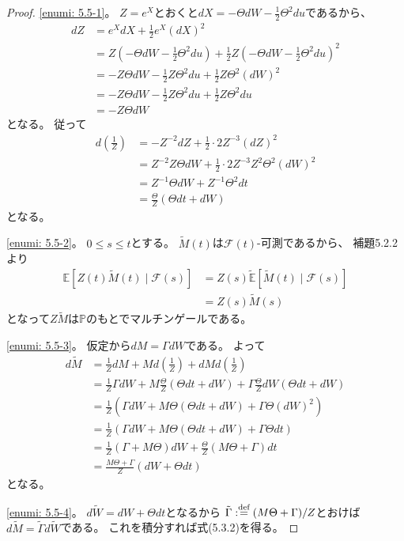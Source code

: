 \documentclass[uplatex]{jsarticle}
\theoremstyle{definition}
\def\P{\mathbb{P}}
\def\E{\mathbb{E}}
\def\mcF{\mathcal{F}}
\def\dfn{:\overset{\mbox{{\scriptsize def}}}{=}}
\begin{document}
\begin{proof}
  \ref{enumi: 5.5-1}。
  \(Z=e^X\)とおくと\(dX = -\Theta dW - \frac{1}{2}\Theta^2du\)であるから、
  \begin{align*}
    dZ &= e^XdX + \frac{1}{2}e^X(dX)^2 \\
    &= Z\left( -\Theta dW - \frac{1}{2}\Theta^2du \right)
    + \frac{1}{2}Z\left( -\Theta dW - \frac{1}{2}\Theta^2du \right)^2  \\
    &= - Z\Theta dW - \frac{1}{2}Z\Theta^2du + \frac{1}{2}Z \Theta^2(dW)^2 \\
    &= - Z\Theta dW - \frac{1}{2}Z\Theta^2du + \frac{1}{2}Z \Theta^2du \\
    &= - Z\Theta dW
  \end{align*}
  となる。
  従って
  \begin{align*}
    d\left( \frac{1}{Z} \right)
    &= -Z^{-2}dZ + \frac{1}{2}\cdot 2Z^{-3} (dZ)^2 \\
    &= Z^{-2}Z\Theta dW  + \frac{1}{2}\cdot 2Z^{-3} Z^2\Theta^2(dW)^2 \\
    &= Z^{-1}\Theta dW  + Z^{-1} \Theta^2dt \\
    &= \frac{\Theta}{Z}\left( \Theta dt + dW \right)
  \end{align*}
  となる。

  \ref{enumi: 5.5-2}。
  \(0\leq s \leq t\)とする。
  \(\tilde{M}(t)\)は\(\mcF(t)\)-可測であるから、
  補題5.2.2より
  \begin{align*}
    \E [Z(t)\tilde{M}(t) \mid \mcF(s)]
    &= Z(s) \tilde{\E}[\tilde{M}(t) \mid \mcF(s)] \\
    &= Z(s) \tilde{M}(s)
  \end{align*}
  となって\(Z\tilde{M}\)は\(\P\)のもとでマルチンゲールである。

  \ref{enumi: 5.5-3}。
  仮定から\(dM = \Gamma dW\)である。
  よって
  \begin{align*}
    d\tilde{M}
    &= \frac{1}{Z}dM
    + Md\left( \frac{1}{Z}\right)
    + dMd\left( \frac{1}{Z} \right) \\
    &= \frac{1}{Z}\Gamma dW
    + M \frac{\Theta}{Z}\left( \Theta dt + dW \right)
    + \Gamma \frac{\Theta}{Z} dW \left( \Theta dt + dW \right) \\
    &= \frac{1}{Z} \left( \Gamma dW
    + M\Theta\left( \Theta dt + dW \right)
    + \Gamma\Theta (dW)^2 \right)\\
    &= \frac{1}{Z} \left( \Gamma dW
    + M\Theta\left( \Theta dt + dW \right)
    + \Gamma\Theta dt \right)\\
    &= \frac{1}{Z} \left (\Gamma + M\Theta \right) dW
    + \frac{\Theta}{Z} \left( M\Theta + \Gamma \right) dt \\
    &= \frac{M\Theta + \Gamma}{Z} \left( dW + \Theta dt \right)
  \end{align*}
  となる。

  \ref{enumi: 5.5-4}。
  \(d\tilde{W} = dW + \Theta dt\)となるから
  \(\tilde{\Gamma} \dfn (M\Theta + \Gamma)/Z\)とおけば
  \(d\tilde{M} = \tilde{\Gamma}d\tilde{W}\)である。
  これを積分すれば式(5.3.2)を得る。
\end{proof}
\end{document}
